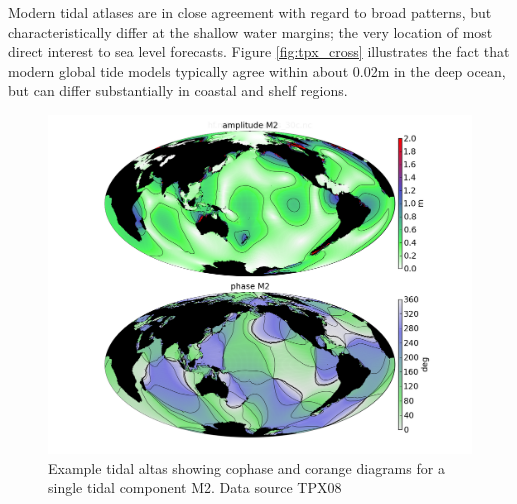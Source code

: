 Modern tidal atlases are in close agreement with regard to broad patterns, but characteristically differ at the shallow water margins; the very location of most direct interest to sea level forecasts.  Figure \ref{fig:tpx_cross} illustrates the fact that modern global tide models typically agree within about 0.02m in the deep ocean, but can differ substantially in coastal and shelf regions.  
\begin{figure}[h]
    \begin{center}
    \includegraphics[width=\figwidthBig]{figures/maps/global_m2_tpx08.png}
    \caption{Example tidal altas showing cophase and corange diagrams for a single tidal component M2.  Data source TPX08 \cite{Egbert:2002ug}  }
    \label{fig:atlas}
    \end{center}
\end{figure}
